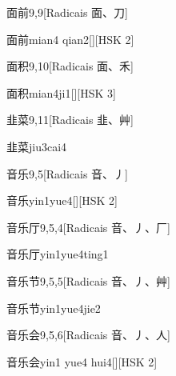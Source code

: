 \begin{entry}{面前}{9,9}[Radicais ⾯、⼑]
  \begin{phonetics}{面前}{mian4 qian2}[][HSK 2]
  \end{phonetics}
\end{entry}

\begin{entry}{面积}{9,10}[Radicais ⾯、⽲]
  \begin{phonetics}{面积}{mian4ji1}[][HSK 3]
  \end{phonetics}
\end{entry}

\begin{entry}{韭菜}{9,11}[Radicais ⾲、⾋]
  \begin{phonetics}{韭菜}{jiu3cai4}
  \end{phonetics}
\end{entry}

\begin{entry}{音乐}{9,5}[Radicais ⾳、⼃]
  \begin{phonetics}{音乐}{yin1yue4}[][HSK 2]
  \end{phonetics}
\end{entry}

\begin{entry}{音乐厅}{9,5,4}[Radicais ⾳、⼃、⼚]
  \begin{phonetics}{音乐厅}{yin1yue4ting1}
  \end{phonetics}
\end{entry}

\begin{entry}{音乐节}{9,5,5}[Radicais ⾳、⼃、⾋]
  \begin{phonetics}{音乐节}{yin1yue4jie2}
  \end{phonetics}
\end{entry}

\begin{entry}{音乐会}{9,5,6}[Radicais ⾳、⼃、⼈]
  \begin{phonetics}{音乐会}{yin1 yue4 hui4}[][HSK 2]
  \end{phonetics}
\end{entry}

